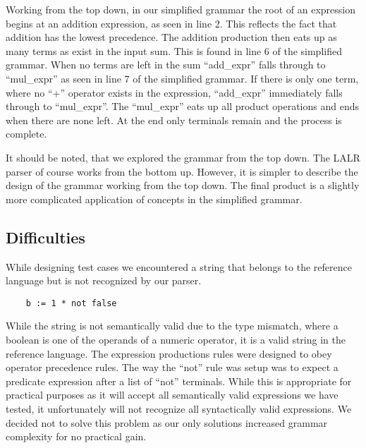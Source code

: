 \documentclass[oneside]{amsart}
\theoremstyle{definition}
\theoremstyle{remark}
\numberwithin{equation}{section}
\begin{document}
Working from the top down, in our simplified grammar the root of an expression begins at an addition
expression, as seen in line 2. This reflects the fact that addition has the lowest precedence. The
addition production then eats up as many terms as exist in the input sum. This is found in line 6 of
the simplified grammar. When no terms are left in the sum ``add\_expr'' falls through to ``mul\_expr''
as seen in line 7 of the simplified grammar. If there is only one term, where no ``+'' operator 
exists in the expression, ``add\_expr'' immediately falls through to ``mul\_expr''. The  ``mul\_expr''
eats up all product operations and ends when there are none left. At the end only terminals remain
and the process is complete.

It should be noted, that we explored the grammar from the top down. The LALR parser of course works
from the bottom up. However, it is simpler to describe the design of the grammar working from the
top down. The final product is a slightly more complicated application of concepts in the simplified
grammar.


\subsection{Difficulties}
While designing test cases we encountered a string that belongs to the reference language but is
not recognized by our parser.

\begin{lstlisting}
    b := 1 * not false
\end{lstlisting}

While the string is not semantically valid due to the type mismatch, where a boolean is one of the
operands of a numeric operator, it is a valid string in the reference language. The expression
productions rules were designed to obey operator precedence rules. The way the ``not'' rule was
setup was to expect a predicate expression after a list of ``not'' terminals. While this is
appropriate for practical purposes as it will accept all semantically valid expressions we have
tested, it unfortunately will not recognize all syntactically valid expressions. We decided not to
solve this problem as our only solutions increased grammar complexity for no practical gain.

\end{document}
